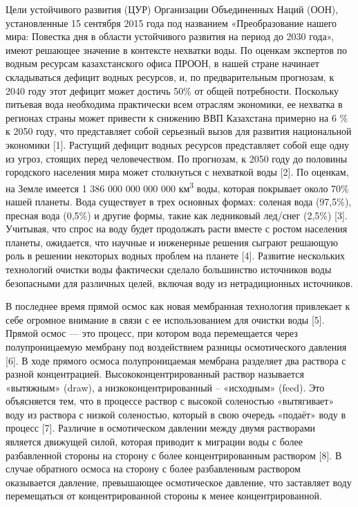 Цели устойчивого развития (ЦУР) Организации Объединенных Наций (ООН),
установленные 15 сентября 2015 года под названием «Преобразование нашего
мира: Повестка дня в области устойчивого развития на период до 2030
года», имеют решающее значение в контексте нехватки воды. По оценкам
экспертов по водным ресурсам казахстанского офиса ПРООН, в нашей стране
начинает складываться дефицит водных ресурсов, и, по предварительным
прогнозам, к 2040 году этот дефицит может достичь 50\% от общей
потребности. Поскольку питьевая вода необходима практически всем
отраслям экономики, ее нехватка в регионах страны может привести к
снижению ВВП Казахстана примерно на 6 \% к 2050 году, что представляет
собой серьезный вызов для развития национальной экономики {[}1{]}.
Растущий дефицит водных ресурсов представляет собой еще одну из угроз,
стоящих перед человечеством. По прогнозам, к 2050 году до половины
городского населения мира может столкнуться с нехваткой воды {[}2{]}. По
оценкам, на Земле имеется 1 386 000 000 000 000 км\textsuperscript{3}
воды, которая покрывает около 70\% нашей планеты. Вода существует в трех
основных формах: соленая вода (97,5\%), пресная вода (0,5\%) и другие
формы, такие как ледниковый лед/снег (2,5\%) {[}3{]}. Учитывая, что
спрос на воду будет продолжать расти вместе с ростом населения планеты,
ожидается, что научные и инженерные решения сыграют решающую роль в
решении некоторых водных проблем на планете {[}4{]}. Развитие нескольких
технологий очистки воды фактически сделало большинство источников воды
безопасными для различных целей, включая воду из нетрадиционных
источников.

В последнее время прямой осмос как новая мембранная технология
привлекает к себе огромное внимание в связи с ее использованием для
очистки воды {[}5{]}. Прямой осмос --- это процесс, при котором вода
перемещается через полупроницаемую мембрану под воздействием разницы
осмотического давления {[}6{]}. В ходе прямого осмоса полупроницаемая
мембрана разделяет два раствора с разной концентрацией.
Высококонцентрированный раствор называется «вытяжным» (draw), а
низкоконцентрированный -- «исходным» (feed). Это объясняется тем, что в
процессе раствор с высокой соленостью «вытягивает» воду из раствора с
низкой соленостью, который в свою очередь «подаёт» воду в процесс
{[}7{]}. Различие в осмотическом давлении между двумя растворами
является движущей силой, которая приводит к миграции воды с более
разбавленной стороны на сторону с более концентрированным раствором
{[}8{]}. В случае обратного осмоса на сторону с более разбавленным
раствором оказывается давление, превышающее осмотическое давление, что
заставляет воду перемещаться от концентрированной стороны к менее
концентрированной.

